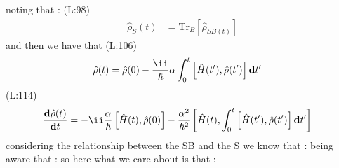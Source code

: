  noting that : 
(L:98)
\begin{equation}
\begin{split}
\hat{\rho }_{S }(t )&=\text{Tr}_{B }\left[\hat{\rho }_{S B (t )}\right]\end{split}
\end{equation}
 and then we have  that
(L:106)
\begin{equation}
\begin{split}
\hat{\rho }(t )&=\hat{\rho }(0)-\dfrac{\ii }{\hbar }\alpha \int _{0}^{t }\left[\hat{H }(t '),\hat{\rho }(t ')\right]\bold{d}t '\end{split}
\end{equation}
(L:114)
\begin{equation}
\begin{split}
\label{canUseBornApprox}\dfrac{\bold{d}\hat{\rho }(t )}{\bold{d}t }&=-\ii \dfrac{\alpha }{\hbar }\left[\hat{H }(t ),\hat{\rho }(0)\right]-\dfrac{\alpha ^{2}}{\hbar ^{2}}\left[\hat{H }(t ),\int _{0}^{t }\left[\hat{H }(t '),\hat{\rho }(t ')\right]\bold{d}t '\right]\end{split}
\end{equation}
considering the relationship between the SB and the S
 we know that : 
 being aware that  : 
 so here what we care about is that : 
 
